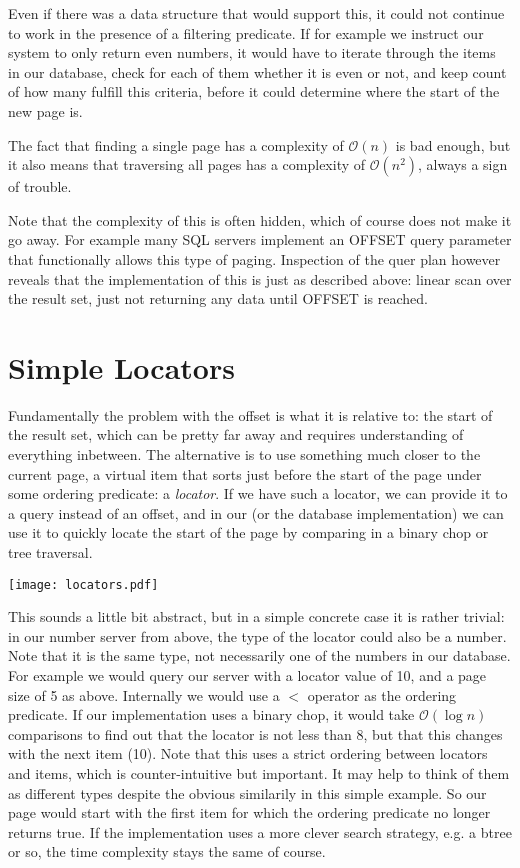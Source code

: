 \documentclass[11pt,a4paper]{article}
\begin{document}
\begin{multicols}{2}
Even if there was a data structure that would support this, it could not
continue to work in the presence of a filtering predicate. If for example we
instruct our system to only return even numbers, it would have to iterate
through the items in our database, check for each of them whether it is even or
not, and keep count of how many fulfill this criteria, before it could determine
where the start of the new page is.

The fact that finding a single page has a complexity of $\mathcal{O}(n)$ is bad
enough, but it also means that traversing all pages has a complexity of
$\mathcal{O}(n^2)$, always a sign of trouble.

Note that the complexity of this is often hidden, which of course does not make
it go away. For example many SQL servers implement an OFFSET query parameter
that functionally allows this type of paging. Inspection of the quer plan
however reveals that the implementation of this is just as described above:
linear scan over the result set, just not returning any data until OFFSET is
reached.

\section*{Simple Locators}

Fundamentally the problem with the offset is what it is relative to: the start
of the result set, which can be pretty far away and requires understanding of
everything inbetween. The alternative is to use something much closer to the
current page, a virtual item that sorts just before the start of the page under
some ordering predicate: a {\em locator}. If we have such a locator, we can provide it
to a query instead of an offset, and in our (or the database implementation) we
can use it to quickly locate the start of the page by comparing in a binary chop
or tree traversal.

\texttt{[image: locators.pdf]}

This sounds a little bit abstract, but in a simple concrete case it is rather
trivial: in our number server from above, the type of the locator could also be
a number. Note that it is the same type, not necessarily one of the numbers in
our database. For example we would query our server with a locator value of 10,
and a page size of 5 as above. Internally we would use a $<$ operator as the
ordering predicate. If our implementation uses a binary chop, it would take
$\mathcal{O}(\log{}n)$ comparisons to find out that the locator is not less
than 8, but that this changes with the next item (10). Note that this uses a
strict ordering between locators and items, which is counter-intuitive but
important. It may help to think of them as different types despite the obvious
similarily in this simple example. So our page would start with the first item
for which the ordering predicate no longer returns true. If the implementation
uses a more clever search strategy, e.g. a btree or so, the time complexity
stays the same of course.


\end{multicols}
\end{document}
